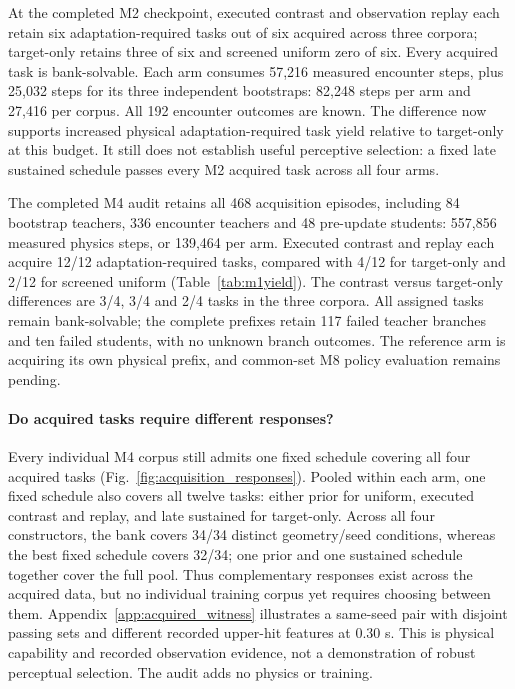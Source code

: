 \documentclass[10pt]{article}
\begin{document}
At the completed M2 checkpoint, executed contrast and observation replay each
retain six adaptation-required tasks out of six acquired across three corpora;
target-only retains three of six and screened uniform zero of six. Every acquired
task is bank-solvable. Each arm consumes 57,216 measured encounter steps, plus
25,032 steps for its three independent bootstraps: 82,248 steps per arm and
27,416 per corpus. All 192 encounter outcomes are known. The difference now
supports increased physical adaptation-required task yield relative to target-only
at this budget. It still does not establish useful perceptive selection: a fixed
late sustained schedule passes every M2 acquired task across all four arms.

The completed M4 audit retains all 468 acquisition episodes, including
84 bootstrap teachers, 336 encounter teachers and 48 pre-update students:
557,856 measured physics steps, or 139,464 per arm. Executed contrast and replay
each acquire 12/12 adaptation-required tasks, compared with 4/12 for target-only
and 2/12 for screened uniform (Table~\ref{tab:m1yield}). The contrast versus
target-only differences are 3/4, 3/4 and 2/4 tasks in the three corpora. All
assigned tasks remain bank-solvable; the complete prefixes retain 117 failed
teacher branches and ten failed students, with no unknown branch outcomes.
The reference arm is acquiring its own physical prefix, and common-set M8
policy evaluation remains pending.

\paragraph{Do acquired tasks require different responses?}
Every individual M4 corpus still admits one fixed schedule covering all four
acquired tasks (Fig.~\ref{fig:acquisition_responses}). Pooled within each arm,
one fixed schedule also covers all twelve tasks: either prior for uniform,
executed contrast and replay, and late sustained for target-only. Across all
four constructors, the bank covers 34/34 distinct geometry/seed conditions,
whereas the best fixed schedule covers 32/34; one prior and one sustained
schedule together cover the full pool. Thus complementary responses exist
across the acquired data, but no individual training corpus yet requires
choosing between them. Appendix~\ref{app:acquired_witness} illustrates a
same-seed pair with disjoint passing sets and different recorded upper-hit
features at 0.30 s. This is physical capability and recorded observation evidence,
not a demonstration of robust perceptual selection. The audit adds no physics
or training.
\end{document}
